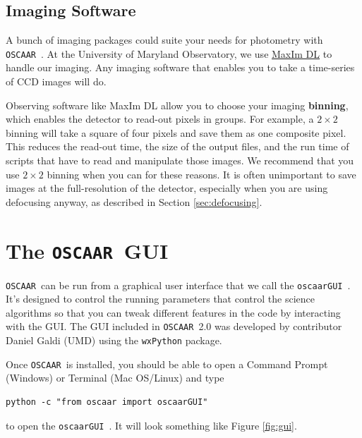\documentclass[a4paper]{article}
\newcommand{\code}[1]{\texttt{#1}}
\newcommand{\oscaar}{\code{OSCAAR}~}
\newcommand{\gui}{\code{oscaarGUI}~}
\begin{document}
\subsection{Imaging Software}
A bunch of imaging packages could suite your needs for photometry with \oscaar. At the University of Maryland Observatory, we use \href{http://www.cyanogen.com/maxim_main.php}{MaxIm DL} to handle our imaging. Any imaging software that enables you to take a time-series of CCD images will do. 

Observing software like MaxIm DL allow you to choose your imaging \textbf{binning}, which enables the detector to read-out pixels in groups. For example, a $2\times2$ binning will take a square of four pixels and save them as one composite pixel. This reduces the read-out time, the size of the output files, and the run time of scripts that have to read and manipulate those images. We recommend that you use $2\times2$ binning when you can for these reasons. It is often unimportant to save images at the full-resolution of the detector, especially when you are using defocusing anyway, as described in Section \ref{sec:defocusing}. 

\section{The \oscaar GUI} \label{sec:run}

\oscaar can be run from a graphical user interface that we call the \gui. It's designed to control the running parameters that control the science algorithms so that you can tweak different features in the code by interacting with the GUI. The GUI included in \oscaar 2.0 was developed by contributor Daniel Galdi (UMD) using the \code{wxPython} package.

Once \oscaar is installed, you should be able to open a Command Prompt (Windows) or Terminal (Mac OS/Linux) and type

\begin{verbatim}
python -c "from oscaar import oscaarGUI"
\end{verbatim}

\noindent to open the \gui. It will look something like Figure \ref{fig:gui}.
\end{document}
